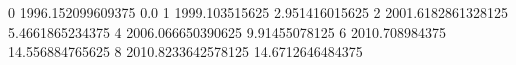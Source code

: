 0 1996.152099609375 0.0
1 1999.103515625 2.951416015625
2 2001.6182861328125 5.4661865234375
4 2006.066650390625 9.91455078125
6 2010.708984375 14.556884765625
8 2010.8233642578125 14.6712646484375
